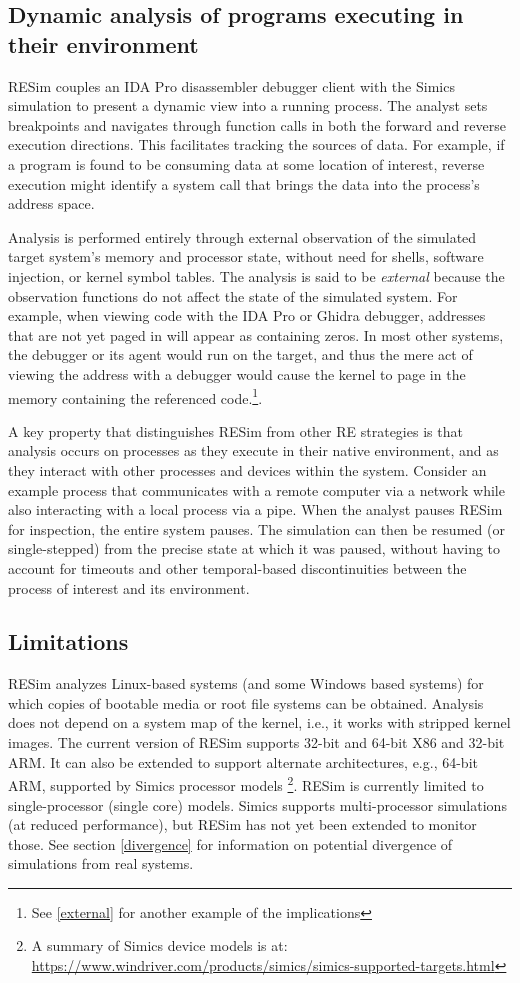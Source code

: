 \documentclass[titlepage]{article}
\begin{document}
\subsection{Dynamic analysis of programs executing in their environment}
RESim couples an IDA Pro disassembler debugger client with the Simics simulation to present a dynamic view into a running process.  The analyst sets breakpoints and navigates through function calls in both the forward and reverse execution directions.  This facilitates tracking the sources of data.  For example, if a program is found to be consuming data at some location of interest, reverse execution might identify a system call that brings the data into the process’s address space.

Analysis is performed entirely through external observation of the simulated target system's memory and processor state, 
without need for shells, software injection, or kernel symbol tables.   The analysis is said to be \textit{external} because the observation functions do
not affect the state of the simulated system.  For example, when viewing code with the IDA Pro or Ghidra debugger, addresses that are not yet paged in will appear as containing zeros.
In most other systems, the debugger or its agent would run on the target, and thus the mere act of viewing the address with a debugger 
would cause the kernel to page
in the memory containing the referenced code.\footnote{See \ref{external} for another example of the implications}.

A key property that distinguishes RESim from other RE strategies is that analysis occurs on processes as they execute in their native environment, and as they interact with other processes and devices within the system.  Consider an example process that communicates with a remote computer via a network while also interacting with a local process via a pipe.  When the analyst pauses RESim for inspection, the entire system pauses.  The simulation can then be resumed (or single-stepped) from the precise state at which it was paused, without having to account for timeouts and other temporal-based discontinuities between the process of interest and its environment.

\subsection{Limitations}
RESim analyzes Linux-based systems (and some Windows based systems) for which copies of bootable media or root file systems can be obtained.  Analysis does not depend on a system map of the kernel, i.e., it works with stripped kernel images.  The current version of RESim supports 32-bit and 64-bit X86 and 32-bit ARM.  It can also be 
extended to support alternate architectures, e.g., 64-bit ARM, supported by Simics processor models \footnote{A summary of Simics device models is at: \url{https://www.windriver.com/products/simics/simics-supported-targets.html}}.  RESim is currently limited to single-processor (single core) models.  Simics supports
multi-processor simulations (at reduced performance), but RESim has not yet been extended to monitor those.
See section \ref{divergence} for information on potential divergence of simulations from real systems.
\end{document}
